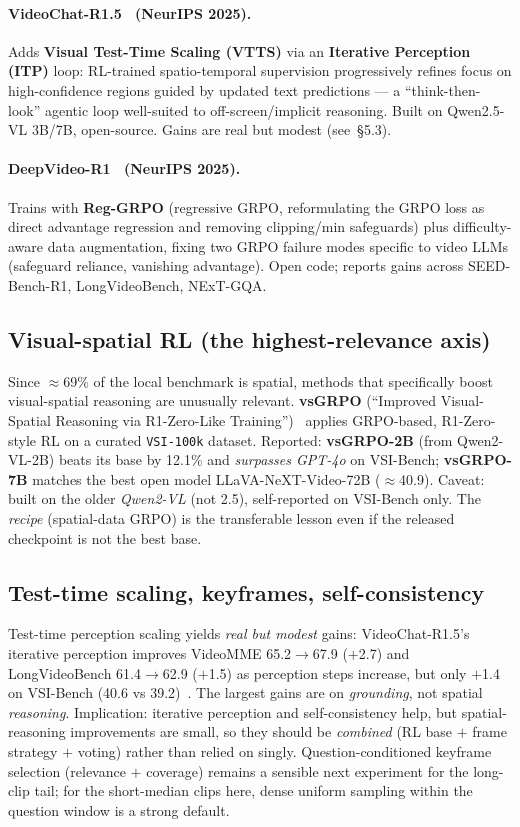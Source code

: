 \documentclass[11pt]{article}
\begin{document}
\paragraph{VideoChat-R1.5~\cite{videochatr15} (NeurIPS 2025).} Adds \textbf{Visual
Test-Time Scaling (VTTS)} via an \textbf{Iterative Perception (ITP)} loop:
RL-trained spatio-temporal supervision progressively refines focus on
high-confidence regions guided by updated text predictions --- a ``think-then-look''
agentic loop well-suited to off-screen/implicit reasoning. Built on Qwen2.5-VL
3B/7B, open-source. Gains are real but modest (see~\S5.3).

\paragraph{DeepVideo-R1~\cite{deepvideor1} (NeurIPS 2025).} Trains with
\textbf{Reg-GRPO} (regressive GRPO, reformulating the GRPO loss as direct
advantage regression and removing clipping/min safeguards) plus difficulty-aware
data augmentation, fixing two GRPO failure modes specific to video LLMs
(safeguard reliance, vanishing advantage). Open code; reports gains across
SEED-Bench-R1, LongVideoBench, NExT-GQA.

\subsection{Visual-spatial RL (the highest-relevance axis)}
Since $\approx$69\% of the local benchmark is spatial, methods that specifically
boost visual-spatial reasoning are unusually relevant. \textbf{vsGRPO}
(``Improved Visual-Spatial Reasoning via R1-Zero-Like Training'')~\cite{vsgrpo}
applies GRPO-based, R1-Zero-style RL on a curated \texttt{VSI-100k} dataset.
Reported: \textbf{vsGRPO-2B} (from Qwen2-VL-2B) beats its base by 12.1\% and
\emph{surpasses GPT-4o} on VSI-Bench; \textbf{vsGRPO-7B} matches the best open
model LLaVA-NeXT-Video-72B ($\approx$40.9). Caveat: built on the older
\emph{Qwen2-VL} (not 2.5), self-reported on VSI-Bench only. The \emph{recipe}
(spatial-data GRPO) is the transferable lesson even if the released checkpoint is
not the best base.

\subsection{Test-time scaling, keyframes, self-consistency}
Test-time perception scaling yields \emph{real but modest} gains: VideoChat-R1.5's
iterative perception improves VideoMME 65.2$\to$67.9 ($+$2.7) and LongVideoBench
61.4$\to$62.9 ($+$1.5) as perception steps increase, but only $+$1.4 on VSI-Bench
(40.6 vs 39.2)~\cite{videochatr15}. The largest gains are on \emph{grounding}, not
spatial \emph{reasoning}. Implication: iterative perception and self-consistency
help, but spatial-reasoning improvements are small, so they should be
\emph{combined} (RL base $+$ frame strategy $+$ voting) rather than relied on
singly. Question-conditioned keyframe selection (relevance $+$ coverage) remains a
sensible next experiment for the long-clip tail; for the short-median clips here,
dense uniform sampling within the question window is a strong default.
\end{document}
